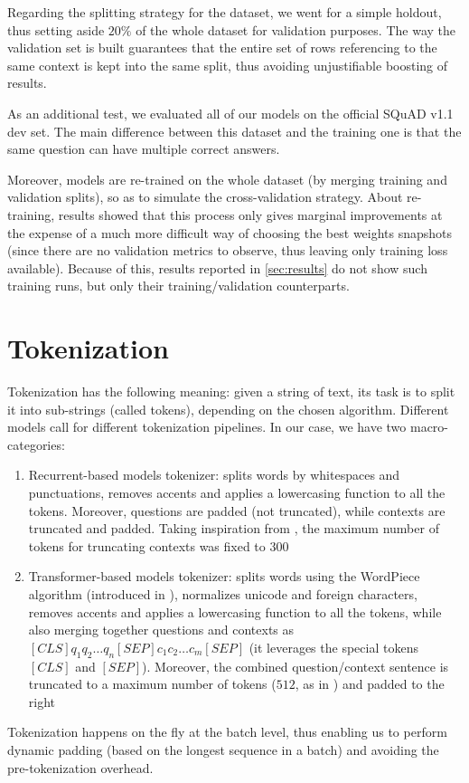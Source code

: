 \documentclass[a4paper,10pt]{report}
\begin{document}
Regarding the splitting strategy for the dataset, we went for a simple holdout, thus setting aside $20\%$ of the whole dataset for validation purposes. The way the validation set is built guarantees that the entire set of rows referencing to the same context is kept into the same split, thus avoiding unjustifiable boosting of results.

As an additional test, we evaluated all of our models on the official SQuAD v1.1 dev set. The main difference between this dataset and the training one is that the same question can have multiple correct answers.

Moreover, models are re-trained on the whole dataset (by merging training and validation splits), so as to simulate the cross-validation strategy. About re-training, results showed that this process only gives marginal improvements at the expense of a much more difficult way of choosing the best weights snapshots (since there are no validation metrics to observe, thus leaving only training loss available). Because of this, results reported in \ref{sec:results} do not show such training runs, but only their training/validation counterparts.  

\section{Tokenization}\label{sec:tokenization}
Tokenization has the following meaning: given a string of text, its task is to split it into sub-strings (called tokens), depending on the chosen algorithm. Different models call for different tokenization pipelines. In our case, we have two macro-categories:
\begin{enumerate}
  \item Recurrent-based models tokenizer: splits words by whitespaces and punctuations, removes accents and applies a lowercasing function to all the tokens. Moreover, questions are padded (not truncated), while contexts are truncated and padded. Taking inspiration from \cite{max-context-tokens}, the maximum number of tokens for truncating contexts was fixed to $300$
  \item Transformer-based models tokenizer: splits words using the WordPiece algorithm (introduced in \cite{wordpiece}), normalizes unicode and foreign characters, removes accents and applies a lowercasing function to all the tokens, while also merging together questions and contexts as $[CLS] q_1 q_2 \dots q_n [SEP] c_1 c_2 \dots c_m [SEP]$ (it leverages the special tokens $[CLS]$ and $[SEP]$). Moreover, the combined question/context sentence is truncated to a maximum number of tokens ($512$, as in \cite{bert}) and padded to the right
\end{enumerate}
Tokenization happens on the fly at the batch level, thus enabling us to perform dynamic padding (based on the longest sequence in a batch) and avoiding the pre-tokenization overhead.
\end{document}
